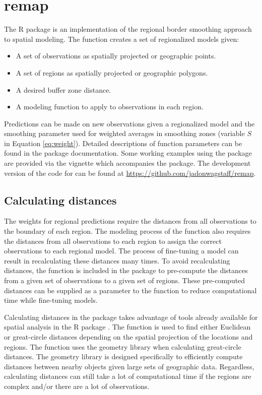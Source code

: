 \section{remap}

The R package  is an implementation of the regional border smoothing approach to spatial modeling. The function  creates a set of regionalized models given:
\begin{itemize}
    \item A set of observations as spatially projected or geographic points.
    \item A set of regions as spatially projected or geographic polygons.
    \item A desired buffer zone distance.
    \item A modeling function to apply to observations in each region.
\end{itemize} Predictions can be made on new observations given a regionalized model and the smoothing parameter  used for weighted averages in smoothing zones (variable $S$ in Equation \ref{eq:weight}). Detailed descriptions of function parameters can be found in the package documentation. Some working examples using the  package are provided via the vignette which accompanies the package. The development version of the code for  can be found at \url{https://github.com/jadonwagstaff/remap}.

\subsection{Calculating distances}

The weights for regional predictions require the distances from all observations to the boundary of each region. The modeling process of the  function also requires the distances from all observations to each region to assign the correct observations to each regional model. The process of fine-tuning a model can result in recalculating these distances many times. To avoid recalculating distances, the function  is included in the  package to pre-compute the distances from a given set of observations to a given set of regions. These pre-computed distances can be supplied as a parameter to the  function to reduce computational time while fine-tuning models.

Calculating distances in the  package takes advantage of tools already available for spatial analysis in the R package  \citep{pebesma2018}. The function  is used to find either Euclidean or great-circle distances depending on the spatial projection of the locations and regions. The  function uses the  geometry library \citep{google2020} when calculating great-circle distances. The  geometry library is designed specifically to efficiently compute distances between nearby objects given large sets of geographic data. Regardless, calculating distances can still take a lot of computational time if the regions are complex and/or there are a lot of observations.

